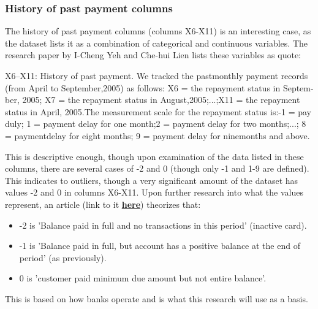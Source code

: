         \subsubsection{History of past payment columns}
            The history of past payment columns (columns X6-X11) is an interesting case, as the dataset lists it as a combination of categorical and continuous variables. The research paper by I-Cheng Yeh and Che-hui Lien \cite{CCdata} lists these variables as quote:
            \begin{displayquote}
                X6–X11: History of past payment. We tracked the pastmonthly payment records (from April to September,2005) as follows: X6 = the repayment status in Septem-ber,  2005;  X7 = the  repayment  status  in  August,2005;...;X11 = the repayment status in April, 2005.The measurement scale for the repayment status is:-1 = pay duly; 1 = payment delay for one month;2 = payment delay for two months;...; 8 = paymentdelay for eight months; 9 = payment delay for ninemonths and above.
            \end{displayquote}
            This is descriptive enough, though upon examination of the data listed in these columns, there are several cases of -2 and 0 (though only -1 and 1-9 are defined). This indicates to outliers, though a very significant amount of the dataset has values -2 and 0 in columns X6-X11. Upon further research into what the values represent, an article (link to it \href{http://inseaddataanalytics.github.io/INSEADAnalytics/CourseSessions/ClassificationProcessCreditCardDefault.html}{\textbf{here}}) theorizes that\cite{1}:
            \begin{itemize}
                \item -2 is 'Balance paid in full and no transactions in this period' (inactive card).
                \item -1 is 'Balance paid in full, but account has a positive balance at the end of period' (as previously).
                \item 0 is 'customer paid minimum due amount but not entire balance'.
            \end{itemize}
            This is based on how banks operate and is what this research will use as a basis.\\\\
    
